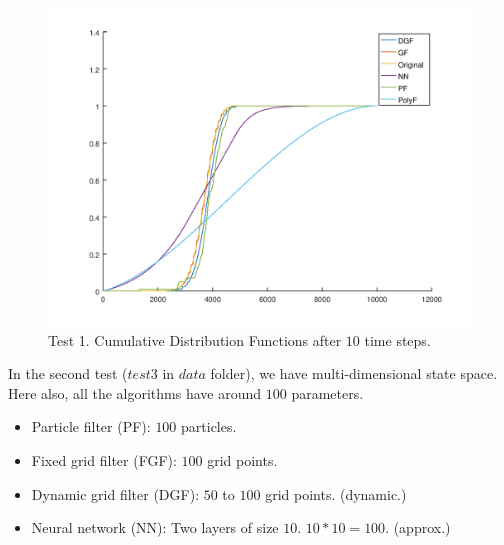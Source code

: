 \begin{figure}
\caption{Test 1. Cumulative Distribution Functions after $10$ time steps.}
\includegraphics[width=\linewidth]{test1_10}
\end{figure}

In the second test ($test3$ in $data$ folder), we have multi-dimensional state space. Here also, all the algorithms have around $100$ parameters.
\begin{itemize}
    \item Particle filter (PF): $100$ particles.
    \item Fixed grid filter (FGF): $100$ grid points.
    \item Dynamic grid filter (DGF): $50$ to $100$ grid points. (dynamic.)
    \item Neural network (NN): Two layers of size $10$. $10*10=100$. (approx.)
\end{itemize}

\begin{table}
\caption{Error in the state with maximum probability.}    
\begin{center}
\end{center}
\end{table}

